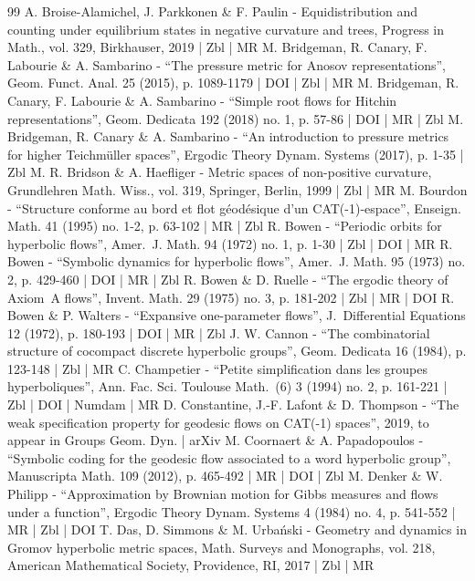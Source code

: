 \documentclass[10pt]{amsart}
\theoremstyle{definition}
\numberwithin{equation}{section}
\begin{document}
\begin{thebibliography}{99}
A. Broise-Alamichel, J. Parkkonen \& F. Paulin - Equidistribution and counting under equilibrium states in negative curvature and trees, Progress in Math., vol. 329, Birkhauser, 2019 | Zbl | MR
M. Bridgeman, R. Canary, F. Labourie \& A. Sambarino - “The pressure metric for Anosov representations”, Geom. Funct. Anal. 25 (2015), p. 1089-1179 | DOI | Zbl | MR
M. Bridgeman, R. Canary, F. Labourie \& A. Sambarino - “Simple root flows for Hitchin representations”, Geom. Dedicata 192 (2018) no. 1, p. 57-86 | DOI | MR | Zbl
M. Bridgeman, R. Canary \& A. Sambarino - “An introduction to pressure metrics for higher Teichmüller spaces”, Ergodic Theory Dynam. Systems (2017), p. 1-35 | Zbl
M. R. Bridson \& A. Haefliger - Metric spaces of non-positive curvature, Grundlehren Math. Wiss., vol. 319, Springer, Berlin, 1999 | Zbl | MR
M. Bourdon - “Structure conforme au bord et flot géodésique d’un CAT(-1)-espace”, Enseign. Math. 41 (1995) no. 1-2, p. 63-102 | MR | Zbl
R. Bowen - “Periodic orbits for hyperbolic flows”, Amer. J. Math. 94 (1972) no. 1, p. 1-30 | Zbl | DOI | MR
R. Bowen - “Symbolic dynamics for hyperbolic flows”, Amer. J. Math. 95 (1973) no. 2, p. 429-460 | DOI | MR | Zbl
R. Bowen \& D. Ruelle - “The ergodic theory of Axiom A flows”, Invent. Math. 29 (1975) no. 3, p. 181-202 | Zbl | MR | DOI
R. Bowen \& P. Walters - “Expansive one-parameter flows”, J. Differential Equations 12 (1972), p. 180-193 | DOI | MR | Zbl
J. W. Cannon - “The combinatorial structure of cocompact discrete hyperbolic groups”, Geom. Dedicata 16 (1984), p. 123-148 | Zbl | MR
C. Champetier - “Petite simplification dans les groupes hyperboliques”, Ann. Fac. Sci. Toulouse Math. (6) 3 (1994) no. 2, p. 161-221 | Zbl | DOI | Numdam | MR
D. Constantine, J.-F. Lafont \& D. Thompson - “The weak specification property for geodesic flows on CAT(-1) spaces”, 2019, to appear in Groups Geom. Dyn. | arXiv
M. Coornaert \& A. Papadopoulos - “Symbolic coding for the geodesic flow associated to a word hyperbolic group”, Manuscripta Math. 109 (2012), p. 465-492 | MR | DOI | Zbl
M. Denker \& W. Philipp - “Approximation by Brownian motion for Gibbs measures and flows under a function”, Ergodic Theory Dynam. Systems 4 (1984) no. 4, p. 541-552 | MR | Zbl | DOI
T. Das, D. Simmons \& M. Urbański - Geometry and dynamics in Gromov hyperbolic metric spaces, Math. Surveys and Monographs, vol. 218, American Mathematical Society, Providence, RI, 2017 | Zbl | MR

\end{thebibliography}
\end{document}
